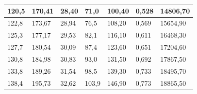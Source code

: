 \documentclass[a4paper,12pt]{article} %
\begin{document}
\begin{table}[h!]
\begin{tabular}{|l|l|l|l|l|l|l|}
		120,5                                     & 170,41                                                  & 28,40                                                 & 71,0                                     & 100,40                                                  & 0,528                        & 14806,70                                        \\ \hline
		122,8                                     & 173,67                                                  & 28,94                                                 & 76,5                                     & 108,20                                                  & 0,569                        & 15654,90                                        \\ \hline
		125,3                                     & 177,17                                                  & 29,53                                                 & 82,1                                     & 116,10                                                  & 0,611                        & 16468,30                                        \\ \hline
		127,7                                     & 180,54                                                  & 30,09                                                 & 87,4                                     & 123,60                                                  & 0,651                        & 17204,60                                        \\ \hline
		130,8                                     & 184,98                                                  & 30,83                                                 & 93,0                                     & 131,50                                                  & 0,692                        & 17867,50                                        \\ \hline
		133,8                                     & 189,26                                                  & 31,54                                                 & 98,5                                     & 139,30                                                  & 0,733                        & 18495,70                                        \\ \hline
		138,4                                     & 195,73                                                  & 32,62                                                 & 103,9                                    & 146,90                                                  & 0,773                        & 18865,50                                        \\ \hline

\end{tabular}
\end{table}
\end{document}

